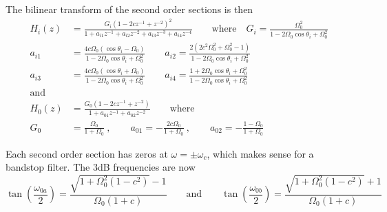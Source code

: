 The bilinear transform of the second order sections is then
\begin{align*}
	H_i(z) &= \frac{G_i(1-2cz^{-1}+z^{-2})^2}{1+a_{i1}z^{-1}+a_{i2}z^{-2}+a_{i3}z^{-3}+a_{i4}z^{-4}}
	\qquad \text{where} \quad
	G_i = \frac{\Omega_0^2}{1-2\Omega_0\cos\theta_i+\Omega_0^2} \\
	a_{i1} &= \frac{4c\Omega_0(\cos\theta_i-\Omega_0)}{1-2\Omega_0\cos\theta_i+\Omega_0^2} \qquad
	a_{i2} = \frac{2(2c^2\Omega_0^2+\Omega_0^2-1)}{1-2\Omega_0\cos\theta_i+\Omega_0^2} \\
	a_{i3} &= \frac{4c\Omega_0(\cos\theta_i+\Omega_0)}{1-2\Omega_0\cos\theta_i+\Omega_0^2} \qquad
	a_{i4} = \frac{1+2\Omega_0\cos\theta_i+\Omega_0^2}{1-2\Omega_0\cos\theta_i+\Omega_0^2} \\
	\text{and} \\
	H_0(z) &= \frac{G_0(1-2cz^{-1}+z^{-2})}{1+a_{01}z^{-1}+a_{02}z^{-2}} \qquad \text{where} \\
	G_0 &= \frac{\Omega_0}{1+\Omega_0}\:,\qquad
	a_{01} = -\frac{2c\Omega_0}{1+\Omega_0} \:,\qquad
	a_{02} = -\frac{1-\Omega_0}{1+\Omega_0}
\end{align*}

Each second order section has zeros at $\omega = \pm \omega_c$,  which makes
sense for a bandstop filter. The 3dB frequencies are now
\begin{equation*}
	\tan\left(\frac{\omega_{0a}}{2}\right) = \frac{\sqrt{1+\Omega_0^2(1-c^2)}-1}{\Omega_0(1+c)}
  \qquad \text{and} \qquad
	\tan\left(\frac{\omega_{0b}}{2}\right) = \frac{\sqrt{1+\Omega_0^2(1-c^2)}+1}{\Omega_0(1+c)}
\end{equation*}
\newpage